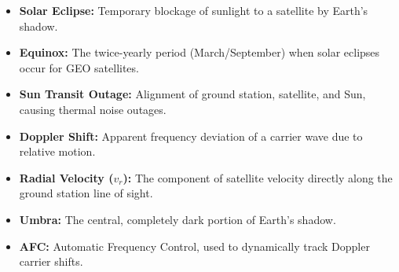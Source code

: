 \documentclass[12pt,a4paper]{article}
\begin{document}
\begin{tcolorbox}[defbox, title={\textbf{One-Line Definitions}}]
\begin{itemize}[leftmargin=*, itemsep=2.5pt, topsep=0pt]
  \item \textbf{Solar Eclipse:} Temporary blockage of sunlight to a satellite by Earth's shadow.
  \item \textbf{Equinox:} The twice-yearly period (March/September) when solar eclipses occur for GEO satellites.
  \item \textbf{Sun Transit Outage:} Alignment of ground station, satellite, and Sun, causing thermal noise outages.
  \item \textbf{Doppler Shift:} Apparent frequency deviation of a carrier wave due to relative motion.
  \item \textbf{Radial Velocity ($v_r$):} The component of satellite velocity directly along the ground station line of sight.
  \item \textbf{Umbra:} The central, completely dark portion of Earth's shadow.
  \item \textbf{AFC:} Automatic Frequency Control, used to dynamically track Doppler carrier shifts.
\end{itemize}
\end{tcolorbox}
\end{document}

